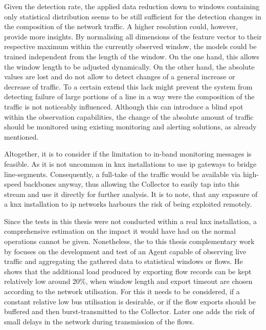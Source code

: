 Given the detection rate, the applied data reduction down to windows containing only statistical distribution seems to be still sufficient for the detection changes in the composition of the network traffic. A higher resolution could, however, provide more insights.
By normalising all dimensions of the feature vector to their respective maximum within the currently observed window, the models could be trained independent from the length of the window. On the one hand, this allows the window length to be adjusted dynamically.
On the other hand, the absolute values are lost and do not allow to detect changes of a general increase or decrease of traffic. 
To a certain extend this lack might prevent the system from detecting failure of large portions of a line in a way were the composition of the traffic is not noticeably influenced.
Although this can introduce a blind spot within the observation capabilities, the change of the absolute amount of traffic should be monitored using existing monitoring and alerting solutions, as already mentioned.

Altogether, it is to consider if the limitation to in-band monitoring messages is feasible. As it is not uncommon in \gls{knx} installations to use \gls{ip} gateways to bridge line-segments. Consequently, a full-take of the traffic would be available via high-speed backbones anyway, thus allowing the Collector to easily tap into this stream and use it directly for further analysis.
It is to note, that any exposure of a \gls{knx} installation to \gls{ip} networks harbours the risk of being exploited remotely.

Since the tests in this thesis were not conducted within a real \gls{knx} installation, a comprehensive estimation on the impact it would have had on the normal operations cannot be given. %
Nonetheless, the to this thesis complementary work by \textcite{Jung2018} focuses on the development and test of an Agent capable of observing live traffic and aggregating the gathered data to statistical windows or flows.
He shows that the additional load produced by exporting flow records can be kept relatively low around 20\%, when window length and export timeout are chosen according to the network utilisation.
For this it needs to be considered, if a constant relative low bus utilisation is desirable, or if the flow exports should be buffered and then burst-transmitted to the Collector. Later one adds the risk of small delays in the network during transmission of the flows.

